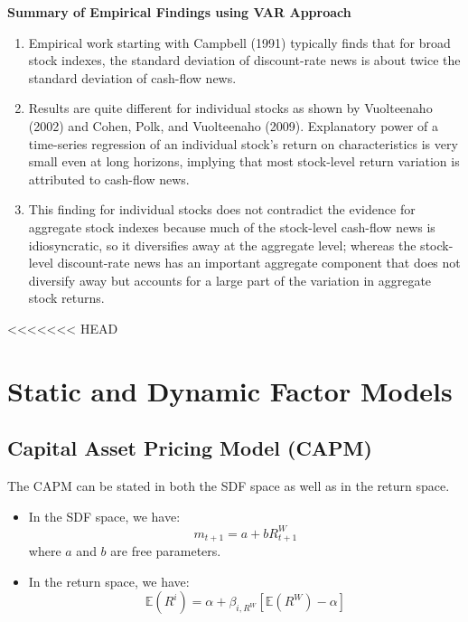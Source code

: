 \documentclass[
]{book}
\begin{document}
\textbf{Summary of Empirical Findings using VAR Approach}

\begin{enumerate}
\def\labelenumi{\arabic{enumi}.}
\item
  Empirical work starting with Campbell (1991) typically finds that for broad stock indexes, the standard deviation of discount-rate news is about twice the standard deviation of cash-flow news.
\item
  Results are quite different for individual stocks as shown by Vuolteenaho (2002) and Cohen, Polk, and Vuolteenaho (2009). Explanatory power of a time-series regression of an individual stock's return on characteristics is very small even at long horizons, implying that most stock-level return variation is attributed to cash-flow news.
\item
  This finding for individual stocks does not contradict the evidence for aggregate stock indexes because much of the stock-level cash-flow news is idiosyncratic, so it diversifies away at the aggregate level; whereas the stock-level discount-rate news has an important aggregate component that does not diversify away but accounts for a large part of the variation in aggregate stock returns.
\end{enumerate}

<<<<<<< HEAD
\hypertarget{static-and-dynamic-factor-models}{%
\chapter{Static and Dynamic Factor Models}\label{static-and-dynamic-factor-models}}

\hypertarget{capital-asset-pricing-model-capm}{%
\section{Capital Asset Pricing Model (CAPM)}\label{capital-asset-pricing-model-capm}}

The CAPM can be stated in both the SDF space as well as in the return space.

\begin{itemize}
\item
  In the SDF space, we have:
  \[
  m_{t+1}=a+bR_{t+1}^{W}
  \]
  where \(a\) and \(b\) are free parameters.
\item
  In the return space, we have:
  \[
  \mathbb{E}\left(R^{i}\right)=\alpha+\beta_{i,R^{W}}\left[\mathbb{E}\left(R^{W}\right)-\alpha\right]
  \]
\end{itemize}
\end{document}
